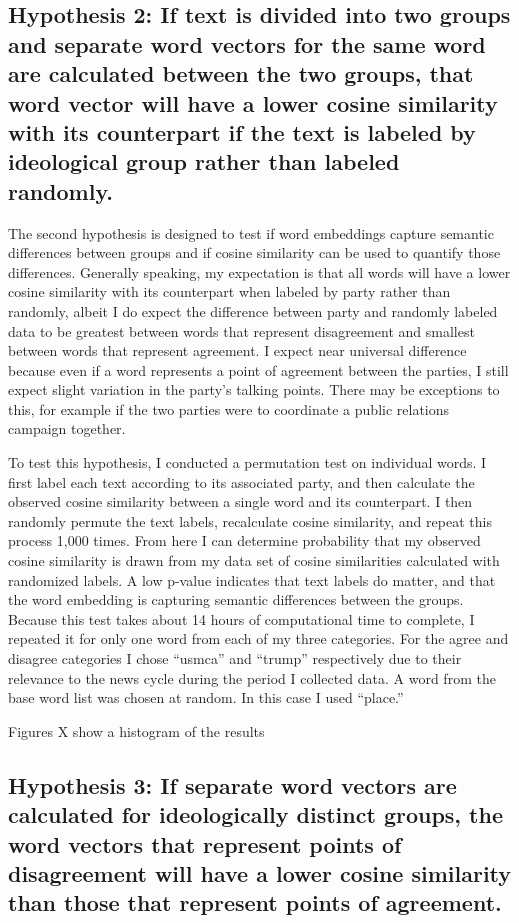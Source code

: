 \documentclass[../embeddings.tex]{subfiles}
\begin{document}
\subsection{Hypothesis 2: If text is divided into two groups and separate word vectors for the same word are calculated between the two groups, that word vector will have a lower cosine similarity with its counterpart if the text is labeled by ideological group rather than labeled randomly.}

The second hypothesis is designed to test if word embeddings capture semantic differences between groups and if cosine similarity can be used to quantify those differences. Generally speaking, my expectation is that all words will have a lower cosine similarity with its counterpart when labeled by party rather than randomly, albeit I do expect the difference between party and randomly labeled data to be greatest between words that represent disagreement and smallest between words that represent agreement. I expect near universal difference because even if a word represents a point of agreement between the parties, I still expect slight variation in the party’s talking points. There may be exceptions to this, for example if the two parties were to coordinate a public relations campaign together.

To test this hypothesis, I conducted a permutation test on individual words. I first label each text according to its associated party, and then calculate the observed cosine similarity between a single word and its counterpart. I then randomly permute the text labels, recalculate cosine similarity, and repeat this process 1,000 times. From here I can determine probability that my observed cosine similarity is drawn from my data set of cosine similarities calculated with randomized labels. A low p-value indicates that text labels do  matter, and that the word embedding is capturing semantic differences between the groups. Because this test takes about 14 hours of computational time to complete, I repeated it for only one word from each of my three categories. For the agree and disagree categories I chose “usmca” and “trump” respectively due to their relevance to the news cycle during the period I collected data. A word from the base word list was chosen at random. In this case I used “place.”

Figures X show a histogram of the results 


\subsection{Hypothesis 3: If separate word vectors are calculated for ideologically distinct groups, the word vectors that represent points of disagreement will have a lower cosine similarity than those that represent points of agreement.}
\end{document}
